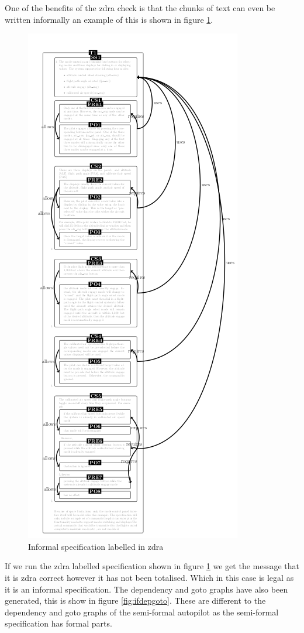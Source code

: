One of the benefits of the \gls{zdra} check is that the chunks of text can even be
written informally an example of this is shown in figure \ref{fig:informalzdra}.

\begin{figure}[H]
     \centering
     \includegraphics[scale=0.6]{Figures/fullexample/informalZDRa.png}
     \caption{Informal specification labelled in \gls{zdra} \label{fig:informalzdra}}
\end{figure}

If we run the \gls{zdra} labelled specification shown in figure
\ref{fig:informalzdra} we get the message that it is \gls{zdra} correct however
it has not been totalised. Which in this case is legal as it is an informal
specification. The dependency and goto graphs have also been
generated, this is show in figure \ref{fig:ifdepgoto}. These are different
to the dependency and goto graphs of the semi-formal autopilot as the
semi-formal specification has formal parts.

